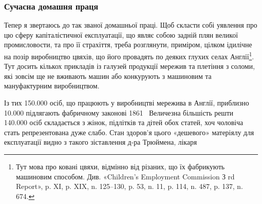 \subsubsection{Сучасна домашня праця}

Тепер я звертаюсь до так званої домашньої праці. Щоб скласти
собі уявлення про цю сферу капіталістичної експлуатації, що
являє собою задній плян великої промисловости, та про її страхіття,
треба розглянути, приміром, цілком ідилічне на позір виробництво
цвяхів, що його провадять по деяких глухих селах Англії\footnote{
Тут мова про ковані цвяхи, відмінно від різаних, що їх фабрикують
машиновим способом. Див. «Children’s Employment Commission
З rd Report», p. XI, p. XIX, n. 125--130, p. 53, n. 11, p. 114, n. 487,
p. 137, n. 674.
}.
Тут досить кількох прикладів із галузей продукції мережив та
плетіння з соломи, які зовсім ще не вживають машин або конкурують
з машиновим та мануфактурним виробництвом.

Із тих \num{150.000} осіб, що працюють у виробництві мережива в
Англії, приблизно \num{10.000} підлягають фабричному законові 1861~
Величезна більшість решти \num{140.000} осіб складається з жінок,
підлітків та дітей обох статей, хоч чоловіча стать репрезентована
дуже слабо. Стан здоров’я цього «дешевого» матеріялу для експлуатації
видно з такого зіставлення д-ра Трюймена, лікаря
\parbreak{}  %
